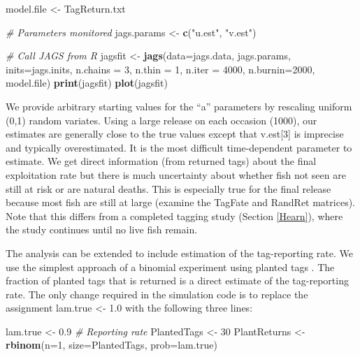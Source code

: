 \documentclass[
]{krantz}
\makeatletter
\newenvironment{Shaded}{\begin{snugshade}}{\end{snugshade}}
\newcommand{\AttributeTok}[1]{\textcolor[rgb]{0.27,0.27,0.27}{#1}}
\newcommand{\CommentTok}[1]{\textcolor[rgb]{0.37,0.37,0.37}{\textit{#1}}}
\newcommand{\DecValTok}[1]{\textcolor[rgb]{0.06,0.06,0.06}{#1}}
\newcommand{\FloatTok}[1]{\textcolor[rgb]{0.06,0.06,0.06}{#1}}
\newcommand{\FunctionTok}[1]{\textcolor[rgb]{0.27,0.27,0.27}{\textbf{#1}}}
\newcommand{\NormalTok}[1]{#1}
\newcommand{\OtherTok}[1]{\textcolor[rgb]{0.37,0.37,0.37}{#1}}
\newcommand{\StringTok}[1]{\textcolor[rgb]{0.5,0.5,0.5}{#1}}
\newenvironment{kframe}{%
\medskip{}
\setlength{\fboxsep}{.8em}
 \def\at@end@of@kframe{}%
 \ifinner\ifhmode%
  \def\at@end@of@kframe{\end{minipage}}%
  \begin{minipage}{\columnwidth}%
 \fi\fi%
 \def\FrameCommand##1{\hskip\@totalleftmargin \hskip-\fboxsep
 \colorbox{shadecolor}{##1}\hskip-\fboxsep
     \hskip-\linewidth \hskip-\@totalleftmargin \hskip\columnwidth}%
 \MakeFramed {\advance\hsize-\width
   \@totalleftmargin\z@ \linewidth\hsize
   \@setminipage}}%
 {\par\unskip\endMakeFramed%
 \at@end@of@kframe}
\renewenvironment{Shaded}{\begin{kframe}}{\end{kframe}}
\makeatother
\begin{document}
\begin{Shaded}
\begin{Highlighting}[]
\NormalTok{  model.file }\OtherTok{\textless{}{-}} \StringTok{\textquotesingle{}TagReturn.txt\textquotesingle{}}

  \CommentTok{\# Parameters monitored}
\NormalTok{  jags.params }\OtherTok{\textless{}{-}} \FunctionTok{c}\NormalTok{(}\StringTok{"u.est"}\NormalTok{, }\StringTok{"v.est"}\NormalTok{)}

   \CommentTok{\# Call JAGS from R}
\NormalTok{  jagsfit }\OtherTok{\textless{}{-}} \FunctionTok{jags}\NormalTok{(}\AttributeTok{data=}\NormalTok{jags.data, jags.params, }\AttributeTok{inits=}\NormalTok{jags.inits,}
                  \AttributeTok{n.chains =} \DecValTok{3}\NormalTok{, }\AttributeTok{n.thin =} \DecValTok{1}\NormalTok{, }\AttributeTok{n.iter =} \DecValTok{4000}\NormalTok{, }
                  \AttributeTok{n.burnin=}\DecValTok{2000}\NormalTok{, model.file)}
  \FunctionTok{print}\NormalTok{(jagsfit)}
  \FunctionTok{plot}\NormalTok{(jagsfit)}
\end{Highlighting}
\end{Shaded}

We provide arbitrary starting values for the ``a'' parameters by rescaling uniform (0,1) random variates. Using a large release on each occasion (1000), our estimates are generally close to the true values except that v.est{[}3{]} is imprecise and typically overestimated. It is the most difficult time-dependent parameter to estimate. We get direct information (from returned tags) about the final exploitation rate but there is much uncertainty about whether fish not seen are still at risk or are natural deaths. This is especially true for the final release because most fish are still at large (examine the TagFate and RandRet matrices). Note that this differs from a completed tagging study (Section \ref{Hearn}), where the study continues until no live fish remain.

The analysis can be extended to include estimation of the tag-reporting rate. We use the simplest approach of a binomial experiment using planted tags \citep{hearn.etal_2003}. The fraction of planted tags that is returned is a direct estimate of the tag-reporting rate. The only change required in the simulation code is to replace the assignment lam.true \textless- 1.0 with the following three lines:

\begin{Shaded}
\begin{Highlighting}[]
\NormalTok{lam.true }\OtherTok{\textless{}{-}} \FloatTok{0.9}  \CommentTok{\# Reporting rate}
\NormalTok{PlantedTags }\OtherTok{\textless{}{-}} \DecValTok{30}
\NormalTok{PlantReturns }\OtherTok{\textless{}{-}} \FunctionTok{rbinom}\NormalTok{(}\AttributeTok{n=}\DecValTok{1}\NormalTok{, }\AttributeTok{size=}\NormalTok{PlantedTags, }\AttributeTok{prob=}\NormalTok{lam.true)}
\end{Highlighting}
\end{Shaded}
\end{document}
